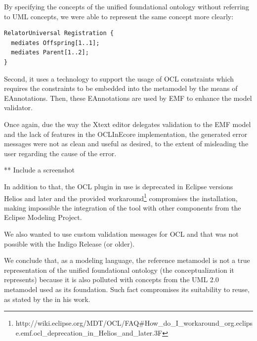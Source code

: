 \documentclass[
	10pt,				%
	oneside,
	a4paper,			%
	brazil,
	english
	]{abntex2}
\begin{document}
By specifying the concepts of the unified foundational ontology without referring
to UML concepts, we were able to represent the same concept more clearly:

\begin{verbatim}
RelatorUniversal Registration {
  mediates Offspring[1..1];
  mediates Parent[1..2];
}
\end{verbatim}

Second, it uses a technology to support the usage of OCL constraints which requires
the constraints to be embedded into the metamodel by the means of EAnnotations.
Then, these EAnnotations are used by EMF to enhance the model validator.

Once again, due the way the Xtext editor delegates validation to the EMF model and
the lack of features in the OCLInEcore implementation, the generated error messages
were not as clean and useful as desired, to the extent of misleading the user
regarding the cause of the error.

** Include a screenshot

In addition to that, the OCL plugin in use is deprecated in Eclipse versions Helios
and later and the provided workaround\footnote{http://wiki.eclipse.org/MDT/OCL/FAQ\#How\_do\_I\_workaround\_org.eclipse.emf.ocl\_deprecation\_in\_Helios\_and\_later.3F} compromises the installation, making impossible the integration
of the tool with other components from the Eclipse Modeling Project.

We also wanted to use custom validation messages for OCL and that was not possible
with the Indigo Release (or older).





We conclude that, as a modeling language, the reference metamodel is not a true
representation of the unified foundational ontology (the conceptualization it represents)
because it is also polluted with concepts from the UML 2.0 metamodel used as its foundation.
Such fact compromises its suitability to reuse, as stated by the \cite{carraretto10} in his work.
\end{document}

